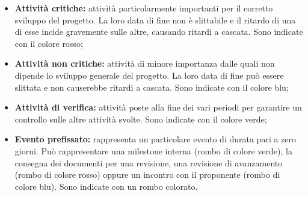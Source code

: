 \begin{itemize}
    \item \textbf{Attività critiche:} attività particolarmente importanti per il corretto sviluppo del progetto. La loro data di fine non è slittabile e il ritardo di una di esse
    incide gravemente sulle altre, causando ritardi a cascata. Sono indicate con il colore rosso;
    \item \textbf{Attività non critiche:} attività di minore importanza dalle quali non dipende lo sviluppo generale del progetto. La loro data di fine può essere slittata e non causerebbe ritardi a cascata.
    Sono indicate con il colore blu;
    \item \textbf{Attività di verifica:} attività poste alla fine dei vari periodi per garantire un controllo sulle altre attività svolte.
    Sono indicate con il colore verde;
    \item \textbf{Evento prefissato:} rappresenta un particolare evento di durata pari a zero giorni. Può rappresentare una milestone interna (rombo di colore verde), la consegna dei documenti
    per una revisione, una revisione di avanzamento (rombo di colore rosso) oppure un incontro con il
    proponente (rombo di colore blu). Sono indicate con un rombo colorato.
  \end{itemize}


